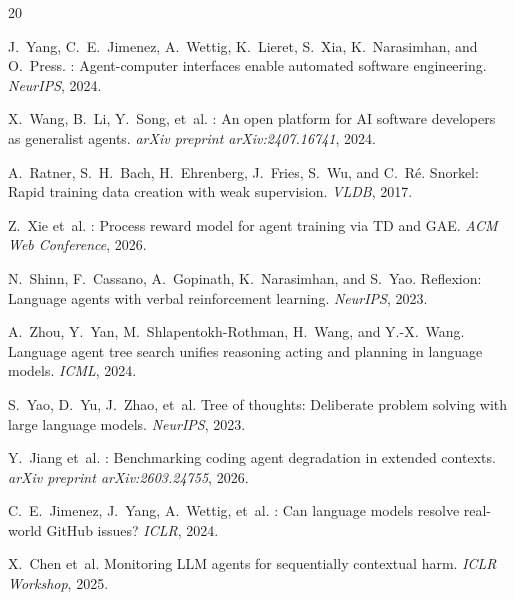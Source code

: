 \documentclass[11pt]{article}
\begin{document}
\begin{thebibliography}{20}

J.~Yang, C.~E.~Jimenez, A.~Wettig, K.~Lieret, S.~Xia, K.~Narasimhan, and O.~Press.
: Agent-computer interfaces enable automated software engineering.
\newblock \emph{NeurIPS}, 2024.

X.~Wang, B.~Li, Y.~Song, et~al.
: An open platform for {AI} software developers as generalist agents.
\newblock \emph{arXiv preprint arXiv:2407.16741}, 2024.

A.~Ratner, S.~H.~Bach, H.~Ehrenberg, J.~Fries, S.~Wu, and C.~R\'{e}.
\newblock Snorkel: Rapid training data creation with weak supervision.
\newblock \emph{VLDB}, 2017.

Z.~Xie et~al.
: Process reward model for agent training via {TD} and {GAE}.
\newblock \emph{ACM Web Conference}, 2026.

N.~Shinn, F.~Cassano, A.~Gopinath, K.~Narasimhan, and S.~Yao.
\newblock Reflexion: Language agents with verbal reinforcement learning.
\newblock \emph{NeurIPS}, 2023.

A.~Zhou, Y.~Yan, M.~Shlapentokh-Rothman, H.~Wang, and Y.-X.~Wang.
\newblock Language agent tree search unifies reasoning acting and planning in language models.
\newblock \emph{ICML}, 2024.

S.~Yao, D.~Yu, J.~Zhao, et~al.
\newblock Tree of thoughts: Deliberate problem solving with large language models.
\newblock \emph{NeurIPS}, 2023.

Y.~Jiang et~al.
: Benchmarking coding agent degradation in extended contexts.
\newblock \emph{arXiv preprint arXiv:2603.24755}, 2026.

C.~E.~Jimenez, J.~Yang, A.~Wettig, et~al.
: Can language models resolve real-world {GitHub} issues?
\newblock \emph{ICLR}, 2024.

X.~Chen et~al.
\newblock Monitoring {LLM} agents for sequentially contextual harm.
\newblock \emph{ICLR Workshop}, 2025.

\end{thebibliography}
\end{document}
